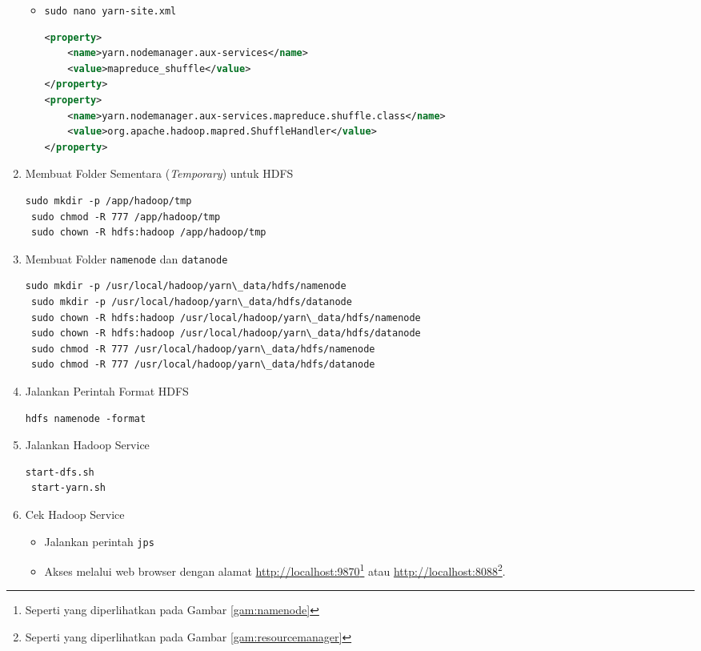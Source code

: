 \documentclass[a4paper]{tufte-handout}
\begin{document}
\begin{enumerate}
\begin{itemize}
\item {\tt sudo nano yarn-site.xml}
\begin{lstlisting}[language=XML]
<property>
	<name>yarn.nodemanager.aux-services</name>
	<value>mapreduce_shuffle</value>
</property>
<property>
	<name>yarn.nodemanager.aux-services.mapreduce.shuffle.class</name>
	<value>org.apache.hadoop.mapred.ShuffleHandler</value>
</property>
\end{lstlisting}
\end{itemize}

\item Membuat Folder Sementara (\textit{Temporary}) untuk HDFS
\begin{lstlisting}[language=Terminal]
 sudo mkdir -p /app/hadoop/tmp
 sudo chmod -R 777 /app/hadoop/tmp
 sudo chown -R hdfs:hadoop /app/hadoop/tmp
\end{lstlisting}

\item Membuat Folder {\tt namenode} dan {\tt datanode}
\begin{lstlisting}[language=Terminal]
 sudo mkdir -p /usr/local/hadoop/yarn\_data/hdfs/namenode
 sudo mkdir -p /usr/local/hadoop/yarn\_data/hdfs/datanode
 sudo chown -R hdfs:hadoop /usr/local/hadoop/yarn\_data/hdfs/namenode
 sudo chown -R hdfs:hadoop /usr/local/hadoop/yarn\_data/hdfs/datanode
 sudo chmod -R 777 /usr/local/hadoop/yarn\_data/hdfs/namenode
 sudo chmod -R 777 /usr/local/hadoop/yarn\_data/hdfs/datanode
\end{lstlisting}

\item Jalankan Perintah Format HDFS
\begin{lstlisting}[language=Terminal]
 hdfs namenode -format
\end{lstlisting}

\item Jalankan Hadoop Service
\begin{lstlisting}[language=Terminal]
 start-dfs.sh
 start-yarn.sh
\end{lstlisting}

\item Cek Hadoop Service
\begin{itemize}
\item Jalankan perintah {\tt jps}
\item Akses melalui web browser dengan alamat \url{http://localhost:9870}\footnote{Seperti yang diperlihatkan pada Gambar \ref{gam:namenode}} atau \url{http://localhost:8088}\footnote{Seperti yang diperlihatkan pada Gambar \ref{gam:resourcemanager}}.
\end{itemize}


\end{enumerate}
\end{document}
